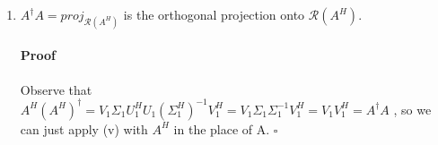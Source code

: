 \documentclass[letterpaper,12pt]{article}
\theoremstyle{definition}
\begin{document}
\begin{enumerate}[label=(\roman*)]
\item $ A^\dag A = proj_{\mathscr{R}(A^H)}$ is the orthogonal projection onto  $\mathscr{R}(A^H)$.

\paragraph{Proof} Observe that $A^H(A^H)^\dag = V_1 \Sigma_1 U_1^H  U_1 (\Sigma_1^H)^{-1} V_1^H 
= V_1 \Sigma_1  \Sigma_1^{-1} V_1^H
= V_1 V_1^H = A^\dag A$ , so we can just apply (v) with $A^H$ in the place of A. $\square$

\end{enumerate}


\vspace{25mm}


\end{document}
